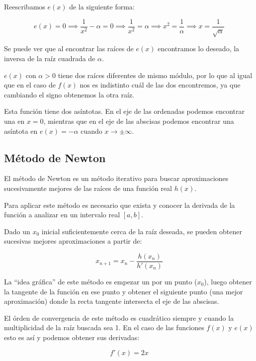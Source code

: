 Reescribamos $e(x)$ de la siguiente forma:

\[
    e(x) = 0 \implies
    \frac{ 1 }{ x^2 } - \alpha = 0 \implies
    \frac{ 1 }{ x^2 } = \alpha \implies
    x^2 = \frac{ 1 }{ \alpha } \implies
    x = \frac{ 1 }{ \sqrt{\alpha} }
\]

Se puede ver que al encontrar las raíces de $e(x)$ encontramos lo deseado, la
inversa de la raíz cuadrada de $\alpha$.

$e(x)$ con $\alpha > 0$ tiene dos raíces diferentes de mismo módulo, por lo que
al igual que en el caso de $f(x)$ nos es indistinto cuál de las dos
encontremos, ya que cambiando el signo obtenemos la otra raíz.

Esta función tiene dos asíntotas. En el eje de las ordenadas podemos encontrar
una en $x = 0$, mientras que en el eje de las abscisas podemos encontrar una
asíntota en $e(x) = - \alpha$ cuando $x \to \pm \infty$.

\subsection{Método de Newton}

El método de Newton es un método iterativo para buscar aproximaciones
sucesivamente mejores de las raíces de una función real $h(x)$.

Para aplicar este método es necesario que exista y conocer la derivada de la
función a analizar en un intervalo real $[a, b]$.

Dado un $x_0$ inicial suficientemente cerca de la raíz deseada, se pueden
obtener sucesivas mejores aproximaciones a partir de:

\begin{equation}\label{newton}
    x_{n + 1} = x_n - \frac{ h(x_n) }{ h'(x_n) }
\end{equation}

La ``idea gráfica'' de este método es empezar un por un punto ($x_0$), luego
obtener la tangente de la función en ese punto y obtener el siguiente punto
(una mejor aproximación) donde la recta tangente intersecta el eje de las
abscisas.

El órden de convergencia de este método es cuadrático siempre y cuando la
multiplicidad de la raíz buscada sea 1. En el caso de las funciones $f(x)$ y
$e(x)$ esto es así y podemos obtener sus derivadas:

\begin{equation}\label{f1_x}
    f'(x) = 2x
\end{equation}

